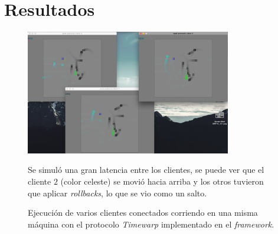 \section{Resultados}

\begin{figure}[h]
\centering
\includegraphics[width=0.8\textwidth]{run}
\caption{\label{fig:execution} \small Ejecución de varios clientes conectados corriendo en una misma máquina con el protocolo \emph{Timewarp} implementado en el \emph{framework}.} Se simuló una gran latencia entre los clientes, se puede ver que el cliente $2$ (color celeste) se movió hacia arriba y los otros tuvieron que aplicar \emph{rollbacks}, lo que se vio como un salto.
\end{figure}



